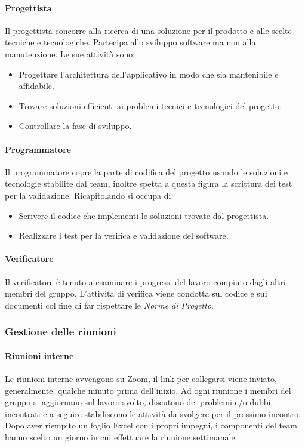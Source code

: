 \paragraph{Progettista}
Il progettista concorre alla ricerca di una soluzione per il prodotto e alle scelte tecniche e tecnologiche.
Partecipa allo sviluppo software ma non alla manutenzione. Le sue attività sono:
\begin{itemize}
    \item Progettare l'architettura dell'applicativo in modo che sia mantenibile e affidabile.
    \item Trovare soluzioni efficienti ai problemi tecnici e tecnologici del progetto.
    \item Controllare la fase di sviluppo.
\end{itemize}

\paragraph{Programmatore}
Il programmatore copre la parte di codifica del progetto usando le soluzioni e tecnologie stabilite dal team, inoltre
spetta a questa figura la scrittura dei test per la validazione. Ricapitolando si occupa di:
\begin{itemize}
    \item Scrivere il codice che implementi le soluzioni trovate dal progettista.
    \item Realizzare i test per la verifica e validazione del software.
\end{itemize}

\paragraph{Verificatore}
Il verificatore è tenuto a esaminare i progressi del lavoro compiuto dagli altri membri del gruppo.   
L'attività di verifica viene condotta sul codice e sui documenti col fine di far rispettare le \emph{Norme di Progetto}.

\subsubsection{Gestione delle riunioni}
\paragraph{Riunioni interne}
Le riunioni interne avvengono su Zoom, il link per collegarsi viene inviato, generalmente, 
qualche minuto prima dell'inizio. Ad ogni riunione i membri del gruppo si aggiornano sul lavoro svolto, discutono dei problemi e/o dubbi incontrati 
e a seguire stabiliscono le attività da svolgere per il prossimo incontro. Dopo aver riempito un foglio Excel con i propri impegni, 
i componenti del team hanno scelto un giorno in cui effettuare la riunione settimanale.

